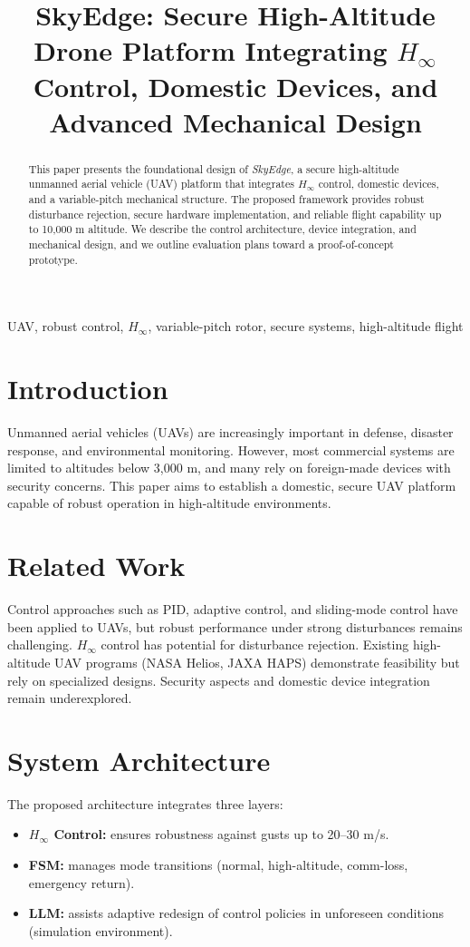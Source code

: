\documentclass[conference]{IEEEtran}
\title{SkyEdge: Secure High-Altitude Drone Platform Integrating $H_\infty$ Control, Domestic Devices, and Advanced Mechanical Design}
\author{
\IEEEauthorblockN{Shinichi Samizo}
\IEEEauthorblockA{Independent Semiconductor Researcher \\
Project Design Hub, Samizo-AITL \\
\textit{Email:} \href{mailto:shin3t72@gmail.com}{shin3t72@gmail.com} \\
\textit{GitHub:} \href{https://github.com/Samizo-AITL}{Samizo-AITL}}
}
\begin{document}
\maketitle

\begin{abstract}
This paper presents the foundational design of \emph{SkyEdge}, 
a secure high-altitude unmanned aerial vehicle (UAV) platform that 
integrates $H_\infty$ control, domestic devices, and a variable-pitch 
mechanical structure. The proposed framework provides robust disturbance 
rejection, secure hardware implementation, and reliable flight capability 
up to 10,000 m altitude. We describe the control architecture, device 
integration, and mechanical design, and we outline evaluation plans 
toward a proof-of-concept prototype.
\end{abstract}

\begin{IEEEkeywords}
UAV, robust control, $H_\infty$, variable-pitch rotor, secure systems, high-altitude flight
\end{IEEEkeywords}

\section{Introduction}
Unmanned aerial vehicles (UAVs) are increasingly important in defense, 
disaster response, and environmental monitoring. However, most commercial 
systems are limited to altitudes below 3,000 m, and many rely on 
foreign-made devices with security concerns. This paper aims to establish 
a domestic, secure UAV platform capable of robust operation in 
high-altitude environments.

\section{Related Work}
Control approaches such as PID, adaptive control, and sliding-mode 
control have been applied to UAVs, but robust performance under strong 
disturbances remains challenging. $H_\infty$ control has potential for 
disturbance rejection. Existing high-altitude UAV programs (NASA Helios, 
JAXA HAPS) demonstrate feasibility but rely on specialized designs. 
Security aspects and domestic device integration remain underexplored.

\section{System Architecture}
The proposed architecture integrates three layers:
\begin{itemize}
    \item \textbf{$H_\infty$ Control:} ensures robustness against gusts 
    up to 20--30 m/s.
    \item \textbf{FSM:} manages mode transitions (normal, high-altitude, 
    comm-loss, emergency return).
    \item \textbf{LLM:} assists adaptive redesign of control policies in 
    unforeseen conditions (simulation environment).
\end{itemize}
\end{document}
